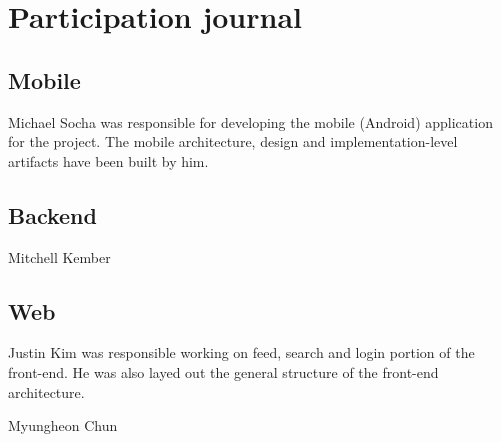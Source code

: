 \documentclass[12pt]{article}
\begin{document}
  \newpage

  \section{Participation journal}
    \subsection{Mobile}
      Michael Socha was responsible for developing the mobile (Android) application for the project. The mobile architecture, design and implementation-level artifacts
      have been built by him.
    \subsection{Backend}
      Mitchell Kember 
    \subsection{Web}
      Justin Kim was responsible working on feed, search and login portion of the front-end. He was also layed out the general structure
      of the front-end architecture. 

      
      Myungheon Chun
    
\end{document}
